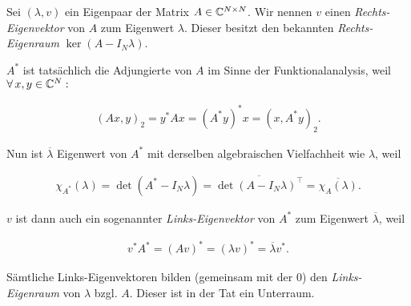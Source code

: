 \begin{remark} \label{links_rechts_eigen_}
    
    Sei $(\lambda, v)$ ein Eigenpaar der Matrix $A \in \mathbb{C}^{N \times N}$.
    Wir nennen $v$ einen \textit{Rechts-Eigenvektor} von $A$ zum Eigenwert $\lambda$.
    Dieser besitzt den bekannten \textit{Rechts-Eigenraum} $\ker (A - I_N \lambda)$.

    $A^\ast$ ist tatsächlich die Adjungierte von $A$ im Sinne der Funktionalanalysis, weil $\forall \, x, y \in \mathbb{C}^N:$

    \begin{align*}
        (A x, y)_2
        =
        y^\ast A x
        =
        (A^\ast y)^\ast x
        =
        (x, A^\ast y)_2.
    \end{align*}

    Nun ist $\overline \lambda$ Eigenwert von $A^\ast$ mit derselben algebraischen Vielfachheit wie $\lambda$, weil

    \begin{align*}
        \chi_{A^\ast}(\lambda)
        =
        \det(A^\ast - I_N \lambda)
        =
        \overline{\det(A - I_N \lambda)^\top}
        =
        \overline{\chi_A(\lambda)}.
    \end{align*}

    $v$ ist dann auch ein sogenannter \textit{Links-Eigenvektor} von $A^\ast$ zum Eigenwert $\overline \lambda$, weil

    \begin{align*}
        v^\ast A^\ast
        =
        (A v)^\ast
        =
        (\lambda v)^\ast
        =
        \overline \lambda v^\ast.
    \end{align*}

    Sämtliche Links-Eigenvektoren bilden (gemeinsam mit der $0$) den \textit{Links-Eigenraum} von $\lambda$ bzgl. $A$.
    Dieser ist in der Tat ein Unterraum.

\end{remark}
